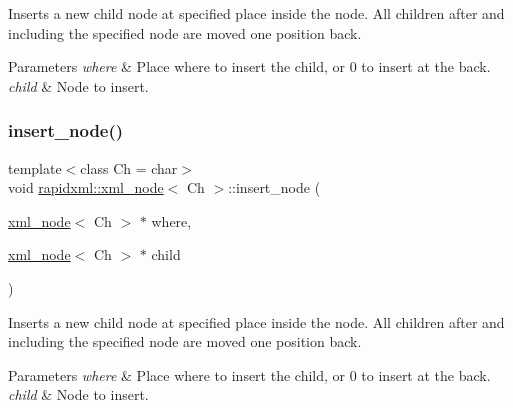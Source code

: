Inserts a new child node at specified place inside the node. All children after and including the specified node are moved one position back. 
\begin{DoxyParams}{Parameters}
{\em where} & Place where to insert the child, or 0 to insert at the back. \\
\hline
{\em child} & Node to insert. \\
\hline
\end{DoxyParams}
\mbox{\label{classrapidxml_1_1xml__node_a666880f42a7e486d78cc45ed51c7c46d}} 
\subsubsection{\texorpdfstring{insert\+\_\+node()}{insert\_node()}\hspace{0.1cm}{\footnotesize\ttfamily [2/2]}}
{\footnotesize\ttfamily template$<$class Ch = char$>$ \\
void \mbox{\hyperlink{classrapidxml_1_1xml__node}{rapidxml\+::xml\+\_\+node}}$<$ Ch $>$\+::insert\+\_\+node (\begin{DoxyParamCaption}\item[{\mbox{\hyperlink{classrapidxml_1_1xml__node}{xml\+\_\+node}}$<$ Ch $>$ $\ast$}]{where,  }\item[{\mbox{\hyperlink{classrapidxml_1_1xml__node}{xml\+\_\+node}}$<$ Ch $>$ $\ast$}]{child }\end{DoxyParamCaption})\hspace{0.3cm}{\ttfamily [inline]}}

Inserts a new child node at specified place inside the node. All children after and including the specified node are moved one position back. 
\begin{DoxyParams}{Parameters}
{\em where} & Place where to insert the child, or 0 to insert at the back. \\
\hline
{\em child} & Node to insert. \\
\hline
\end{DoxyParams}
\mbox{\label{classrapidxml_1_1xml__node_a67db03d1568dc6891573210ddba61520}} 
